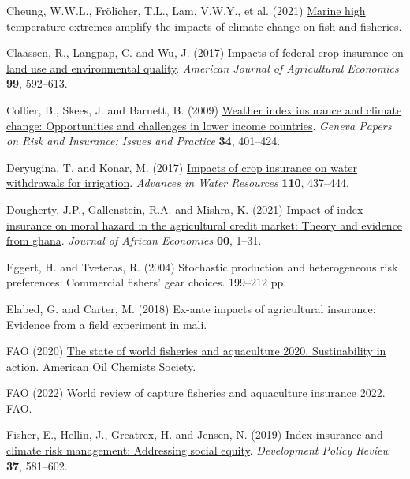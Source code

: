 \documentclass[
  letterpaper,
  DIV=11,
  numbers=noendperiod]{scrartcl}
\newlength{\cslhangindent}
\newenvironment{CSLReferences}[2] %
 {\begin{list}{}{%
  \setlength{\itemindent}{0pt}
  \setlength{\leftmargin}{0pt}
  \setlength{\parsep}{0pt}
  \ifodd #1
   \setlength{\leftmargin}{\cslhangindent}
   \setlength{\itemindent}{-1\cslhangindent}
  \fi
  \setlength{\itemsep}{#2\baselineskip}}}
 {\end{list}}
\theoremstyle{plain}
\theoremstyle{plain}
\theoremstyle{remark}
\begin{document}
\begin{CSLReferences}{1}{0}
Cheung, W.W.L., Frölicher, T.L., Lam, V.W.Y., et al. (2021)
\href{https://www.science.org}{Marine high temperature extremes amplify
the impacts of climate change on fish and fisheries}.

Claassen, R., Langpap, C. and Wu, J. (2017)
\href{https://doi.org/10.1093/AJAE/AAW075}{Impacts of federal crop
insurance on land use and environmental quality}. \emph{American Journal
of Agricultural Economics} \textbf{99}, 592--613.

Collier, B., Skees, J. and Barnett, B. (2009)
\href{https://doi.org/10.1057/gpp.2009.11}{Weather index insurance and
climate change: Opportunities and challenges in lower income countries}.
\emph{Geneva Papers on Risk and Insurance: Issues and Practice}
\textbf{34}, 401--424.

Deryugina, T. and Konar, M. (2017)
\href{https://doi.org/10.1016/j.advwatres.2017.03.013}{Impacts of crop
insurance on water withdrawals for irrigation}. \emph{Advances in Water
Resources} \textbf{110}, 437--444.

Dougherty, J.P., Gallenstein, R.A. and Mishra, K. (2021)
\href{https://doi.org/10.1093/jafeco/ejab003}{Impact of index insurance
on moral hazard in the agricultural credit market: Theory and evidence
from ghana}. \emph{Journal of African Economies} \textbf{00}, 1--31.

Eggert, H. and Tveteras, R. (2004) Stochastic production and
heterogeneous risk preferences: Commercial fishers' gear choices.
199--212 pp.

Elabed, G. and Carter, M. (2018) Ex-ante impacts of agricultural
insurance: Evidence from a field experiment in mali.

FAO (2020) \href{https://doi.org/10.4060/ca9229en}{The state of world
fisheries and aquaculture 2020. Sustinability in action}. American Oil
Chemists Society.

FAO (2022) World review of capture fisheries and aquaculture insurance
2022. FAO.

Fisher, E., Hellin, J., Greatrex, H. and Jensen, N. (2019)
\href{https://doi.org/10.1111/dpr.12387}{Index insurance and climate
risk management: Addressing social equity}. \emph{Development Policy
Review} \textbf{37}, 581--602.


\end{CSLReferences}
\end{document}
